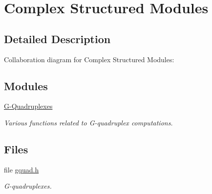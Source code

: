 \hypertarget{group__paired__modules}{}\section{Complex Structured Modules}
\label{group__paired__modules}


\subsection{Detailed Description}
Collaboration diagram for Complex Structured Modules\+:
\subsection*{Modules}
\begin{DoxyCompactItemize}
\item 
\mbox{\hyperlink{group__gquads}{G-\/\+Quadruplexes}}
\begin{DoxyCompactList}\small\item\em Various functions related to G-\/quadruplex computations. \end{DoxyCompactList}\end{DoxyCompactItemize}
\subsection*{Files}
\begin{DoxyCompactItemize}
\item 
file \mbox{\hyperlink{gquad_8h}{gquad.\+h}}
\begin{DoxyCompactList}\small\item\em G-\/quadruplexes. \end{DoxyCompactList}\end{DoxyCompactItemize}
